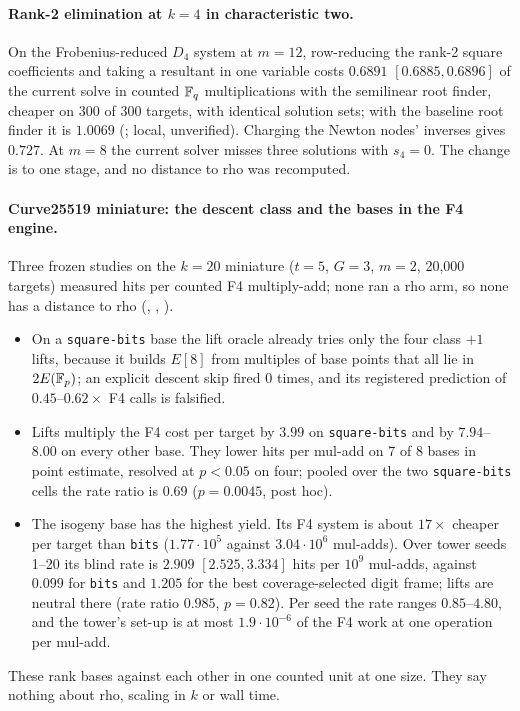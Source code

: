 \paragraph{Rank-2 elimination at $k=4$ in characteristic two.} On the
Frobenius-reduced $D_4$ system at $m=12$, row-reducing the rank-2 square
coefficients and taking a resultant in one variable costs $0.6891$
$[0.6885,0.6896]$ of the current solve in counted $\mathbb{F}_q$ multiplications
with the semilinear root finder, cheaper on 300 of 300 targets, with
identical solution sets; with the baseline root finder it is $1.0069$
(;
local, unverified). Charging the Newton nodes' inverses gives $0.727$. At
$m=8$ the current solver misses three solutions with $s_4=0$. The change
is to one stage, and no distance to rho was recomputed.

\paragraph{Curve25519 miniature: the descent class and the bases in the
F4 engine.} Three frozen studies on the $k=20$ miniature ($t=5$, $G=3$,
$m=2$, 20{,}000 targets) measured hits per counted F4 multiply-add; none
ran a rho arm, so none has a distance to rho
(,
,
).
\begin{itemize}
\item On a \texttt{square-bits} base the lift oracle already tries only the
  four class $+1$ lifts, because it builds $E[8]$ from multiples of base
  points that all lie in $2E(\mathbb{F}_p)$; an explicit descent skip fired 0
  times, and its registered prediction of $0.45$--$0.62\times$ F4 calls
  is falsified.
\item Lifts multiply the F4 cost per target by $3.99$ on
  \texttt{square-bits} and by $7.94$--$8.00$ on every other base. They
  lower hits per mul-add on 7 of 8 bases in point estimate, resolved at
  $p<0.05$ on four; pooled over the two \texttt{square-bits} cells the
  rate ratio is $0.69$ ($p=0.0045$, post hoc).
\item The isogeny base has the highest yield. Its F4 system is about
  $17\times$ cheaper per target than \texttt{bits} ($1.77\cdot10^5$
  against $3.04\cdot10^6$ mul-adds). Over tower seeds 1--20 its blind rate
  is $2.909$ $[2.525,3.334]$ hits per $10^9$ mul-adds, against $0.099$
  for \texttt{bits} and $1.205$ for the best coverage-selected digit
  frame; lifts are neutral there (rate ratio $0.985$, $p=0.82$). Per seed
  the rate ranges $0.85$--$4.80$, and the tower's set-up is at most
  $1.9\cdot10^{-6}$ of the F4 work at one operation per mul-add.
\end{itemize}
These rank bases against each other in one counted unit at one size.
They say nothing about rho, scaling in $k$ or wall time.

